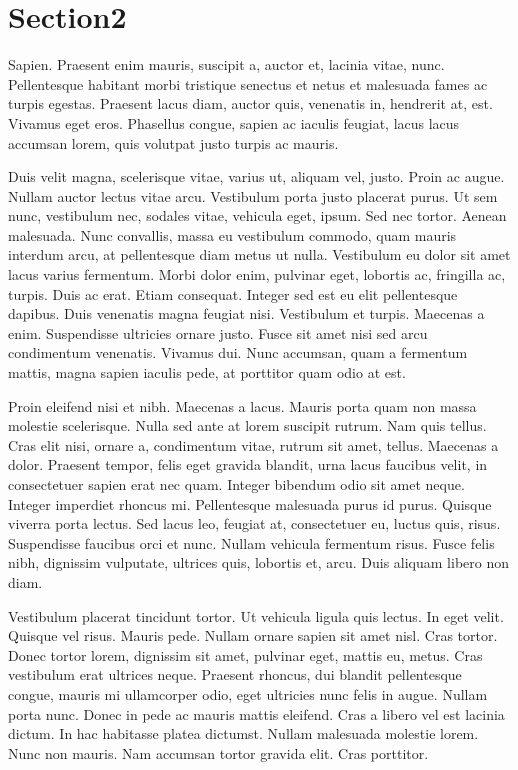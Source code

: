 \section{Section2}
Sapien. Praesent enim mauris, suscipit a, auctor et, lacinia vitae, nunc.
Pellentesque habitant morbi tristique senectus et netus et malesuada fames ac
turpis egestas. Praesent lacus diam, auctor quis, venenatis in, hendrerit at,
est. Vivamus eget eros. Phasellus congue, sapien ac iaculis feugiat, lacus lacus
accumsan lorem, quis volutpat justo turpis ac mauris.

Duis velit magna, scelerisque vitae, varius ut, aliquam vel, justo. Proin ac
augue. Nullam auctor lectus vitae arcu. Vestibulum porta justo placerat purus.
Ut sem nunc, vestibulum nec, sodales vitae, vehicula eget, ipsum. Sed nec
tortor. Aenean malesuada. Nunc convallis, massa eu vestibulum commodo, quam
mauris interdum arcu, at pellentesque diam metus ut nulla. Vestibulum eu dolor
sit amet lacus varius fermentum. Morbi dolor enim, pulvinar eget, lobortis ac,
fringilla ac, turpis. Duis ac erat. Etiam consequat. Integer sed est eu elit
pellentesque dapibus. Duis venenatis magna feugiat nisi. Vestibulum et turpis.
Maecenas a enim. Suspendisse ultricies ornare justo. Fusce sit amet nisi sed
arcu condimentum venenatis. Vivamus dui. Nunc accumsan, quam a fermentum mattis,
magna sapien iaculis pede, at porttitor quam odio at est.

Proin eleifend nisi et nibh. Maecenas a lacus. Mauris porta quam non massa
molestie scelerisque. Nulla sed ante at lorem suscipit rutrum. Nam quis tellus.
Cras elit nisi, ornare a, condimentum vitae, rutrum sit amet, tellus. Maecenas a
dolor. Praesent tempor, felis eget gravida blandit, urna lacus faucibus velit,
in consectetuer sapien erat nec quam. Integer bibendum odio sit amet neque.
Integer imperdiet rhoncus mi. Pellentesque malesuada purus id purus. Quisque
viverra porta lectus. Sed lacus leo, feugiat at, consectetuer eu, luctus quis,
risus. Suspendisse faucibus orci et nunc. Nullam vehicula fermentum risus. Fusce
felis nibh, dignissim vulputate, ultrices quis, lobortis et, arcu. Duis aliquam
libero non diam.

Vestibulum placerat tincidunt tortor. Ut vehicula ligula quis lectus. In eget
velit. Quisque vel risus. Mauris pede. Nullam ornare sapien sit amet nisl. Cras
tortor. Donec tortor lorem, dignissim sit amet, pulvinar eget, mattis eu, metus.
Cras vestibulum erat ultrices neque. Praesent rhoncus, dui blandit pellentesque
congue, mauris mi ullamcorper odio, eget ultricies nunc felis in augue. Nullam
porta nunc. Donec in pede ac mauris mattis eleifend. Cras a libero vel est
lacinia dictum. In hac habitasse platea dictumst. Nullam malesuada molestie
lorem. Nunc non mauris. Nam accumsan tortor gravida elit. Cras porttitor.

